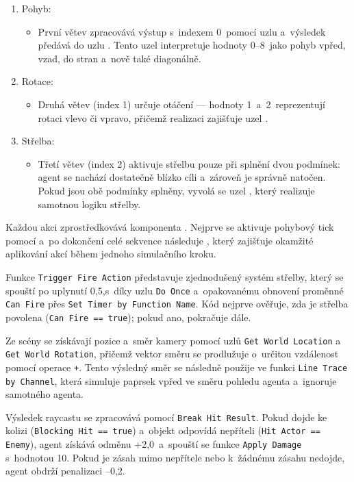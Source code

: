 \begin{enumerate}
\item Pohyb:
\begin{itemize}
\item První větev zpracovává výstup s~indexem 0~pomocí uzlu  a~výsledek předává do uzlu . Tento uzel interpretuje hodnoty 0–8~jako pohyb vpřed, vzad, do stran a~nově také diagonálně.
\end{itemize}
\item Rotace:
\begin{itemize}
\item Druhá větev (index 1) určuje otáčení — hodnoty 1~a~2~reprezentují rotaci vlevo či vpravo, přičemž realizaci zajišťuje uzel .
\end{itemize}
\item Střelba:
\begin{itemize}
\item Třetí větev (index 2) aktivuje střelbu pouze při splnění dvou podmínek: agent se nachází dostatečně blízko cíli a~zároveň je správně natočen. Pokud jsou obě podmínky splněny, vyvolá se uzel , který realizuje samotnou logiku střelby.
\end{itemize}
\end{enumerate}

Každou akci zprostředkovává komponenta . Nejprve se aktivuje pohybový tick pomocí  a~po dokončení celé sekvence následuje , který zajišťuje okamžité aplikování akcí během jednoho simulačního kroku.

Funkce \texttt{Trigger Fire Action} představuje zjednodušený systém střelby, který se spouští po uplynutí 0{,}5,s~díky uzlu \texttt{Do Once} a~opakovanému obnovení proměnné \texttt{Can Fire} přes \texttt{Set Timer by Function Name}. Kód nejprve ověřuje, zda je střelba povolena (\texttt{Can Fire == true}); pokud ano, pokračuje dále.

Ze scény se získávají pozice a~směr kamery pomocí uzlů \texttt{Get World Location} a \texttt{Get World Rotation}, přičemž vektor směru se prodlužuje o~určitou vzdálenost pomocí operace \texttt{+}. Tento výsledný směr se následně použije ve funkci \texttt{Line Trace by Channel}, která simuluje paprsek vpřed ve směru pohledu agenta a~ignoruje samotného agenta.

\newpage

Výsledek raycastu se zpracovává pomocí \texttt{Break Hit Result}. Pokud dojde ke kolizi (\texttt{Blocking Hit == true}) a~objekt odpovídá nepříteli (\texttt{Hit Actor == Enemy}), agent získává odměnu +2{,}0~a~spouští se funkce \texttt{Apply Damage} s~hodnotou 10. Pokud je zásah mimo nepřítele nebo k~žádnému zásahu nedojde, agent obdrží penalizaci –0{,}2.


